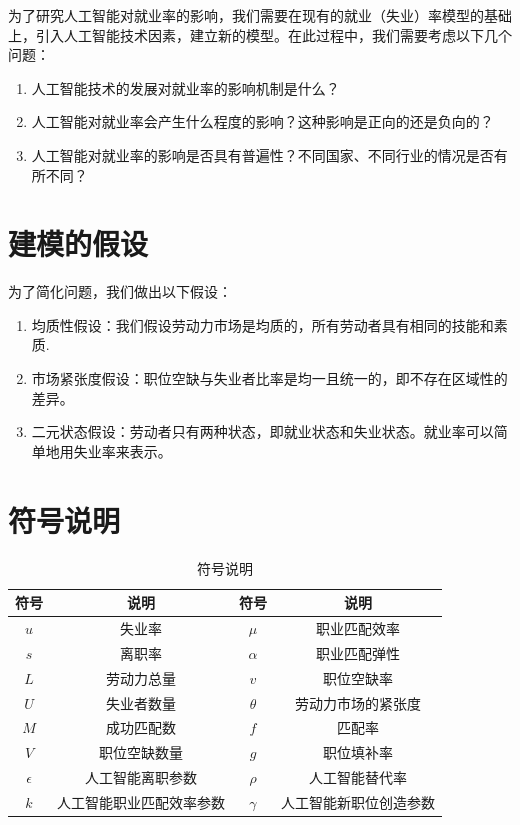 \documentclass{article}
\begin{document}
为了研究人工智能对就业率的影响，我们需要在现有的就业（失业）率模型的基础上，引入人工智能技术因素，建立新的模型。在此过程中，我们需要考虑以下几个问题：

\begin{enumerate}[label=(\arabic*)]
    \item 人工智能技术的发展对就业率的影响机制是什么？
    \item 人工智能对就业率会产生什么程度的影响？这种影响是正向的还是负向的？
    \item 人工智能对就业率的影响是否具有普遍性？不同国家、不同行业的情况是否有所不同？
\end{enumerate}

\section{建模的假设}

为了简化问题，我们做出以下假设：

\begin{enumerate}[label=(\arabic*)]
    \item 均质性假设：我们假设劳动力市场是均质的，所有劳动者具有相同的技能和素质.
    \item 市场紧张度假设：职位空缺与失业者比率是均一且统一的，即不存在区域性的差异。 
    \item 二元状态假设：劳动者只有两种状态，即就业状态和失业状态。就业率可以简单地用失业率来表示。
\end{enumerate}

\section{符号说明}

\begin{table}[H]
    \centering
    \begin{tabular}{cccc}
        \toprule
        符号 & 说明 & 符号 & 说明 \\
        \midrule
        $u$ & 失业率 & $\mu$ & 职业匹配效率 \\
        $s$ & 离职率 & $\alpha$ & 职业匹配弹性 \\
        $L$ & 劳动力总量 & $v$ & 职位空缺率 \\
        $U$ & 失业者数量 & $\theta$ & 劳动力市场的紧张度 \\
        $M$ & 成功匹配数 & $f$ & 匹配率\\
        $V$ & 职位空缺数量 & $g$ & 职位填补率 \\
        $\epsilon$ & 人工智能离职参数 & $\rho$ & 人工智能替代率 \\
        $k$ & 人工智能职业匹配效率参数 & $\gamma$ & 人工智能新职位创造参数 \\
        \bottomrule
    \end{tabular}
    \caption{符号说明}
\end{table}
\end{document}
